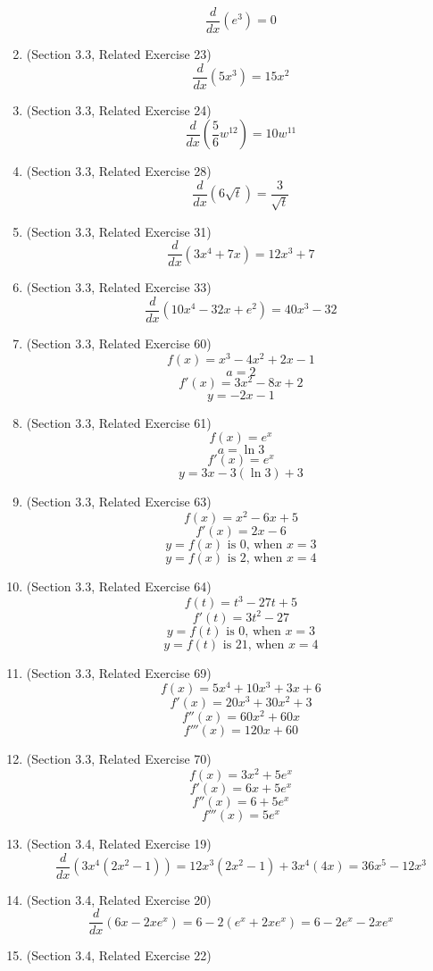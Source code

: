 \documentclass{article}
\begin{document}
\begin{enumerate}
        $$\frac{d}{dx}\left(e^3\right) = 0$$
    \item (Section 3.3, Related Exercise 23)
        $$\frac{d}{dx}\left(5x^3\right) = 15x^2$$
    \item (Section 3.3, Related Exercise 24)
        $$\frac{d}{dx}\left(\frac{5}{6}w^{12}\right) = 10w^{11}$$
    \item (Section 3.3, Related Exercise 28)
        $$\frac{d}{dx}\left(6\sqrt{t}\right) = \frac{3}{\sqrt{t}}$$
    \item (Section 3.3, Related Exercise 31)
        $$\frac{d}{dx}\left(3x^4 + 7x\right) = 12x^3 + 7$$
    \item (Section 3.3, Related Exercise 33)
        $$\frac{d}{dx}\left(10x^4 - 32x + e^2\right) = 40x^3 - 32$$
    \item (Section 3.3, Related Exercise 60)
        $$f(x) = x^3 - 4x^2 + 2x - 1$$
        $$a = 2$$
        $$f'(x) = 3x^2 - 8x + 2$$
        $$y = -2x - 1$$
    \item (Section 3.3, Related Exercise 61)
        $$f(x) = e^x$$
        $$a = \ln{3}$$
        $$f'(x) = e^x$$
        $$y = 3x - 3(\ln{3}) + 3$$
    \item (Section 3.3, Related Exercise 63)
        $$f(x) = x^2 - 6x + 5$$
        $$f'(x) = 2x - 6$$
        $$y = f(x) \text{ is } 0 \text{, when } x = 3$$
        $$y = f(x) \text{ is } 2 \text{, when } x = 4$$
    \item (Section 3.3, Related Exercise 64)
        $$f(t) = t^3 - 27t + 5$$
        $$f'(t) = 3t^2 - 27$$
        $$y = f(t) \text{ is } 0 \text{, when } x = 3$$
        $$y = f(t) \text{ is } 21 \text{, when } x = 4$$
    \item (Section 3.3, Related Exercise 69)
        $$f(x) = 5x^4 + 10x^3 + 3x + 6$$
        $$f'(x) = 20x^3 + 30x^2 + 3$$
        $$f''(x) = 60x^2 + 60x$$
        $$f'''(x) = 120x + 60$$
    \item (Section 3.3, Related Exercise 70)
        $$f(x) = 3x^2 + 5e^x$$
        $$f'(x) = 6x + 5e^x$$
        $$f''(x) = 6 + 5e^x$$
        $$f'''(x) = 5e^x$$
    \item (Section 3.4, Related Exercise 19)
        $$\frac{d}{dx}\left(3x^4(2x^2 - 1)\right) = 12x^3(2x^2 - 1) + 3x^4(4x) = 36x^5 - 12x^3$$
    \item (Section 3.4, Related Exercise 20)
        $$\frac{d}{dx}\left(6x - 2xe^x\right) = 6 - 2(e^x + 2xe^x) = 6 - 2e^x - 2xe^x$$
    \item (Section 3.4, Related Exercise 22)
        \begin{eqnarray}

\end{eqnarray}
\end{enumerate}
\end{document}
